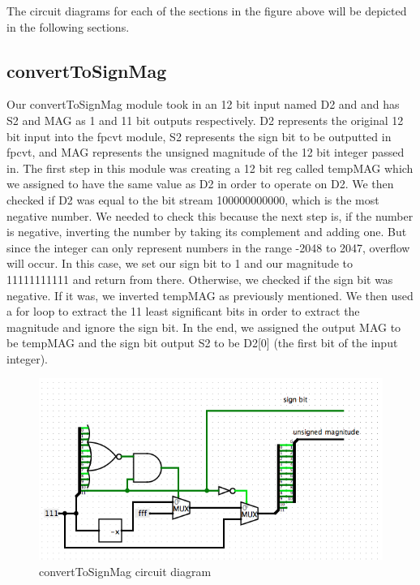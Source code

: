 \documentclass{article}
\begin{document}
The circuit diagrams for each of the sections in the figure above will be depicted in the following sections.

\subsection*{convertToSignMag}
Our convertToSignMag module took in an 12 bit input named D2 and and has S2 and MAG as 1 and 11 bit outputs respectively. D2 represents the original 12 bit input into the fpcvt module, S2 represents the sign bit to be outputted in fpcvt, and MAG represents the unsigned magnitude of the 12 bit integer passed in. The first step in this module was creating a 12 bit reg called tempMAG which we assigned to have the same value as D2 in order to operate on D2. We then checked if D2 was equal to the bit stream 100000000000, which is the most negative number. We needed to check this because the next step is, if the number is negative, inverting the number by taking its complement and adding one. But since the integer can only represent numbers in the range -2048 to 2047, overflow will occur. In this case, we set our sign bit to 1 and our magnitude to 11111111111 and return from there. Otherwise, we checked if the sign bit was negative. If it was, we inverted tempMAG as previously mentioned. We then used a for loop to extract the 11 least significant bits in order to extract the magnitude and ignore the sign bit. In the end, we assigned the output MAG to be tempMAG and the sign bit output S2 to be D2[0] (the first bit of the input integer).

\begin{figure}[H]
	\begin{center}
		\includegraphics[width=1\textwidth]{convertToSignMag.png} 
		\caption{convertToSignMag circuit diagram}
	\end{center}
\end{figure}
\end{document}
